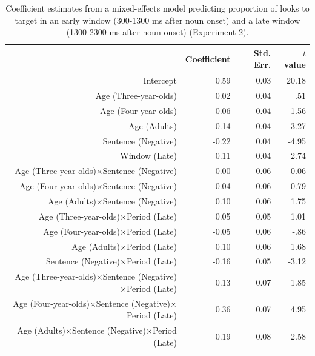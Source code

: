 \documentclass[man]{apa2}
\begin{document}
\begin{table}
\caption{\label{tab:e2model}Coefficient estimates from a mixed-effects model predicting proportion of looks to target in an early window (300-1300 ms after noun onset) and a late window (1300-2300 ms after noun onset) (Experiment 2).}
\begin{center}
\small\addtolength{\tabcolsep}{-5pt}
\begin{tabular}{rrrr}
  \hline
 & Coefficient  & Std. Err. & $t$ value \\ 
  \hline
Intercept & 0.59 & 0.03 & 20.18 \\ 
  Age (Three-year-olds) & 0.02 & 0.04 & .51 \\ 
  Age (Four-year-olds) & 0.06 & 0.04 & 1.56 \\ 
  Age (Adults) & 0.14 & 0.04 & 3.27 \\ 
  Sentence (Negative) & -0.22 & 0.04 & -4.95 \\ 
  Window (Late) & 0.11 & 0.04 & 2.74 \\ 
  Age (Three-year-olds)$\times$Sentence (Negative) & 0.00 & 0.06 & -0.06 \\ 
  Age (Four-year-olds)$\times$Sentence (Negative) & -0.04 & 0.06 & -0.79 \\ 
  Age (Adults)$\times$Sentence (Negative) & 0.10 & 0.06 & 1.75 \\ 
  Age (Three-year-olds)$\times$Period (Late) & 0.05 & 0.05 & 1.01 \\ 
  Age (Four-year-olds)$\times$Period (Late) & -0.05& 0.06 & -.86 \\ 
  Age (Adults)$\times$Period (Late) & 0.10 & 0.06 & 1.68 \\ 
  Sentence (Negative)$\times$Period (Late) & -0.16 & 0.05 & -3.12 \\ 
  Age (Three-year-olds)$\times$Sentence (Negative)$\times$Period (Late) & 0.13 & 0.07 & 1.85 \\ 
  Age (Four-year-olds)$\times$Sentence (Negative)$\times$Period (Late) & 0.36 & 0.07 & 4.95 \\ 
  Age (Adults)$\times$Sentence (Negative)$\times$Period (Late) & 0.19 & 0.08 & 2.58 \\ 
   \hline
\end{tabular}
\end{center}
\end{table}
\end{document}
